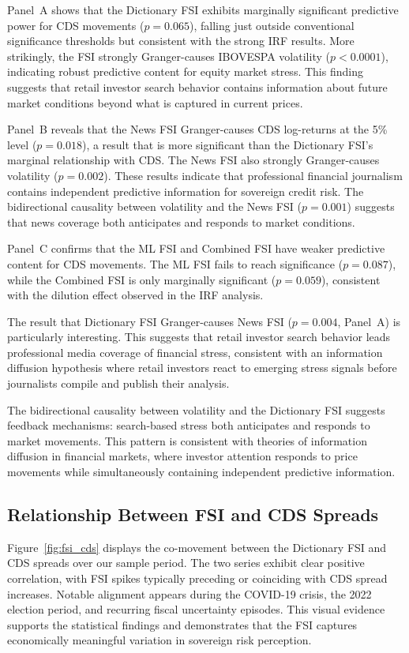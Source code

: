 Panel~A shows that the Dictionary FSI exhibits marginally significant predictive power for CDS movements ($p = 0.065$), falling just outside conventional significance thresholds but consistent with the strong IRF results. More strikingly, the FSI strongly Granger-causes IBOVESPA volatility ($p < 0.0001$), indicating robust predictive content for equity market stress. This finding suggests that retail investor search behavior contains information about future market conditions beyond what is captured in current prices.

Panel~B reveals that the News FSI Granger-causes CDS log-returns at the 5\% level ($p = 0.018$), a result that is more significant than the Dictionary FSI's marginal relationship with CDS. The News FSI also strongly Granger-causes volatility ($p = 0.002$). These results indicate that professional financial journalism contains independent predictive information for sovereign credit risk. The bidirectional causality between volatility and the News FSI ($p = 0.001$) suggests that news coverage both anticipates and responds to market conditions.

Panel~C confirms that the ML FSI and Combined FSI have weaker predictive content for CDS movements. The ML FSI fails to reach significance ($p = 0.087$), while the Combined FSI is only marginally significant ($p = 0.059$), consistent with the dilution effect observed in the IRF analysis.

The result that Dictionary FSI Granger-causes News FSI ($p = 0.004$, Panel~A) is particularly interesting. This suggests that retail investor search behavior leads professional media coverage of financial stress, consistent with an information diffusion hypothesis where retail investors react to emerging stress signals before journalists compile and publish their analysis.

The bidirectional causality between volatility and the Dictionary FSI suggests feedback mechanisms: search-based stress both anticipates and responds to market movements. This pattern is consistent with theories of information diffusion in financial markets, where investor attention responds to price movements while simultaneously containing independent predictive information.

\subsection{Relationship Between FSI and CDS Spreads}

Figure~\ref{fig:fsi_cds} displays the co-movement between the Dictionary FSI and CDS spreads over our sample period. The two series exhibit clear positive correlation, with FSI spikes typically preceding or coinciding with CDS spread increases. Notable alignment appears during the COVID-19 crisis, the 2022 election period, and recurring fiscal uncertainty episodes. This visual evidence supports the statistical findings and demonstrates that the FSI captures economically meaningful variation in sovereign risk perception.

